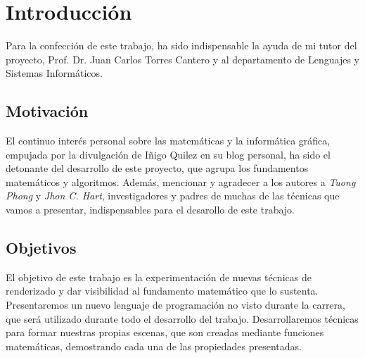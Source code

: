 \chapter*{Introducción}
Para la confección de este trabajo, ha sido indispensable la ayuda de mi tutor del proyecto, Prof. Dr. Juan Carlos Torres Cantero y al departamento de Lenguajes y Sistemas Informáticos.

\section*{Motivación}
El continuo interés personal sobre las matemáticas y la informática gráfica, empujada por la divulgación de Iñigo Quilez en su blog personal, ha sido el detonante del desarrollo de este proyecto, que agrupa los fundamentos matemáticos y algoritmos. Además, mencionar y agradecer a los autores a \textit{Tuong Phong} y \textit{Jhon C. Hart}, investigadores y padres de muchas de las técnicas que vamos a presentar, indispensables para el desarollo de este trabajo.

\section*{Objetivos}
El objetivo de este trabajo es la experimentación de nuevas técnicas de renderizado y  dar visibilidad al fundamento matemático que lo sustenta. Presentaremos un nuevo lenguaje de programación no visto durante la carrera, que será utilizado durante todo el desarrollo del trabajo. Desarrollaremos técnicas para formar nuestras propias escenas, que son creadas mediante funciones matemáticas, demostrando cada una de las propiedades presentadas.


